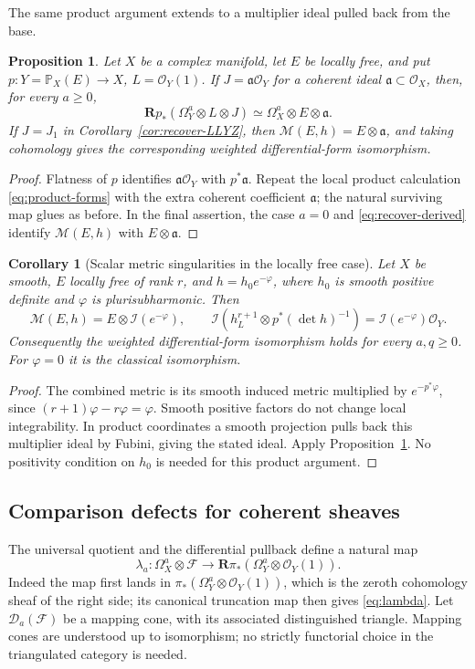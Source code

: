 \documentclass[11pt,reqno]{amsart}
\numberwithin{equation}{section}
\newtheorem{proposition}[theorem]{Proposition}
\newtheorem{corollary}[theorem]{Corollary}
\theoremstyle{definition}
\theoremstyle{remark}
\newcommand{\OO}{\mathcal O}
\newcommand{\FF}{\mathcal F}
\newcommand{\MM}{\mathcal M}
\newcommand{\II}{\mathcal I}
\newcommand{\DD}{\mathcal D}
\newcommand{\PP}{\mathbb P}
\newcommand{\RR}{\mathbf R}
\begin{document}
The same product argument extends to a multiplier ideal pulled back from the base.
\begin{proposition}\label{prop:base-ideal}
Let $X$ be a complex manifold, let $E$ be locally free, and put $p:Y=\PP_X(E)\to X$, $L=\OO_Y(1)$. If $J=\mathfrak a\OO_Y$ for a coherent ideal $\mathfrak a\subset\OO_X$, then, for every $a\geq0$,
\[
 \RR p_*(\Omega_Y^a\otimes L\otimes J)
       \simeq\Omega_X^a\otimes E\otimes\mathfrak a.
\]
If $J=J_1$ in Corollary~\ref{cor:recover-LLYZ}, then $\MM(E,h)=E\otimes\mathfrak a$, and taking cohomology gives the corresponding weighted differential-form isomorphism.
\end{proposition}
\begin{proof}
Flatness of $p$ identifies $\mathfrak a\OO_Y$ with $p^*\mathfrak a$. Repeat the local product calculation \eqref{eq:product-forms} with the extra coherent coefficient $\mathfrak a$; the natural surviving map glues as before. In the final assertion, the case $a=0$ and \eqref{eq:recover-derived} identify $\MM(E,h)$ with $E\otimes\mathfrak a$.
\end{proof}

\begin{corollary}[Scalar metric singularities in the locally free case]\label{cor:scalar-differentials}
Let $X$ be smooth, $E$ locally free of rank $r$, and $h=h_0e^{-\varphi}$, where $h_0$ is smooth positive definite and $\varphi$ is plurisubharmonic. Then
\[
 \MM(E,h)=E\otimes\II(e^{-\varphi}),\qquad
 \II(h_L^{r+1}\otimes p^*(\det h)^{-1})
           =\II(e^{-\varphi})\OO_Y.
\]
Consequently the weighted differential-form isomorphism holds for every $a,q\geq0$. For $\varphi=0$ it is the classical isomorphism.
\end{corollary}
\begin{proof}
The combined metric is its smooth induced metric multiplied by $e^{-p^*\varphi}$, since $(r+1)\varphi-r\varphi=\varphi$. Smooth positive factors do not change local integrability. In product coordinates a smooth projection pulls back this multiplier ideal by Fubini, giving the stated ideal. Apply Proposition~\ref{prop:base-ideal}. No positivity condition on $h_0$ is needed for this product argument.
\end{proof}

\subsection{Comparison defects for coherent sheaves}\label{sec:defects}
The universal quotient and the differential pullback define a natural map
\begin{equation}\label{eq:lambda}
 \lambda_a:\Omega_X^a\otimes\FF\longrightarrow
 \RR\pi_*(\Omega_Y^a\otimes\OO_Y(1)).
\end{equation}
Indeed the map first lands in $\pi_*(\Omega_Y^a\otimes\OO_Y(1))$, which is the zeroth cohomology sheaf of the right side; its canonical truncation map then gives \eqref{eq:lambda}. Let $\DD_a(\FF)$ be a mapping cone, with its associated distinguished triangle. Mapping cones are understood up to isomorphism; no strictly functorial choice in the triangulated category is needed.
\end{document}
